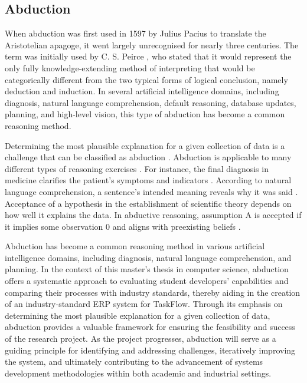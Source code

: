 \subsection{Abduction}
\par{When abduction was first used in 1597 by Julius Pacius to translate the Aristotelian apagoge, it went largely unrecognised for nearly three centuries. The term was initially used by C. S. Peirce \citep{smyth1999peirce}, who stated that it would represent the only fully knowledge-extending method of interpreting that would be categorically different from the two typical forms of logical conclusion, namely deduction and induction. In several artificial intelligence domains, including diagnosis, natural language comprehension, default reasoning, database updates, planning, and high-level vision, this type of abduction has become a common reasoning method.}
\par{Determining the most plausible explanation for a given collection of data is a challenge that can be classified as abduction \citep{josephson1987mechanism}. Abduction is applicable to many different types of reasoning exercises \citep{charniak1985introduction}. For instance, the final diagnosis in medicine clarifies the patient's symptoms and indicators \citep{pople1973mechanization,reggia1983diagnostic}. According to natural language comprehension, a sentence's intended meaning reveals why it was said \citep{hobbs1993interpretation}. Acceptance of a hypothesis in the establishment of scientific theory depends on how well it explains the data. In abductive reasoning, assumption A is accepted if it implies some observation 0 and aligns with preexisting beliefs \citep{lewis1982role}.}
\par{Abduction has become a common reasoning method in various artificial intelligence domains, including diagnosis, natural language comprehension, and planning. In the context of this master's thesis in computer science, abduction offers a systematic approach to evaluating student developers' capabilities and comparing their processes with industry standards, thereby aiding in the creation of an industry-standard ERP system for TaskFlow. Through its emphasis on determining the most plausible explanation for a given collection of data, abduction provides a valuable framework for ensuring the feasibility and success of the research project. As the project progresses, abduction will serve as a guiding principle for identifying and addressing challenges, iteratively improving the system, and ultimately contributing to the advancement of systems development methodologies within both academic and industrial settings.}
